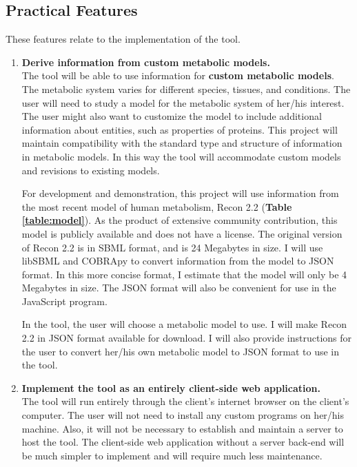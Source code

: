 

\subsection{Practical Features}
These features relate to the implementation of the tool.

\begin{enumerate}

\item \textbf{Derive information from custom metabolic models.}
\\ The tool will be able to use information for \textbf{custom metabolic models}.
The metabolic system varies for different species, tissues, and conditions.
The user will need to study a model for the metabolic system of her/his interest.
The user might also want to customize the model to include additional information about entities, such as properties of proteins.
This project will maintain compatibility with the standard type and structure of information in metabolic models.
In this way the tool will accommodate custom models and revisions to existing models.

For development and demonstration, this project will use information from the most recent model of human metabolism, Recon 2.2 \supercite{thiele_community-driven_2013, swainston_recon_2016} (\textbf{Table \ref{table:model}}).
As the product of extensive community contribution, this model is publicly available and does not have a license.
The original version of Recon 2.2 is in SBML format, and is 24 Megabytes in size.
I will use libSBML \supercite{bornstein_libsbml:_2008} and COBRApy \supercite{ebrahim_cobrapy:_2013} to convert information from the model to JSON format.
In this more concise format, I estimate that the model will only be 4 Megabytes in size.
The JSON format will also be convenient for use in the JavaScript program.

In the tool, the user will choose a metabolic model to use.
I will make Recon 2.2 in JSON format available for download.
I will also provide instructions for the user to convert her/his own metabolic model to JSON format to use in the tool.

\item \textbf{Implement the tool as an entirely client-side web application.}
\\ The tool will run entirely through the client's internet browser on the client's computer.
The user will not need to install any custom programs on her/his machine.
Also, it will not be necessary to establish and maintain a server to host the tool.
The client-side web application without a server back-end will be much simpler to implement and will require much less maintenance.


\end{enumerate}
